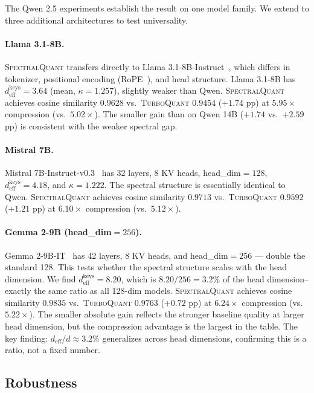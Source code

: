 \documentclass[11pt]{article}
\newcommand{\deff}{d_{\mathrm{eff}}}
\newcommand{\TQ}{\textsc{TurboQuant}}
\newcommand{\SQ}{\textsc{SpectralQuant}}
\begin{document}
The Qwen 2.5 experiments establish the result on one model family.  We extend
to three additional architectures to test universality.

\paragraph{Llama 3.1-8B.}
\SQ{} transfers directly to Llama 3.1-8B-Instruct~\citep{dubey2024llama3},
which differs in tokenizer, positional encoding (RoPE~\citep{su2024roformer}),
and head structure.  Llama 3.1-8B has $\deff^{\mathrm{keys}} = 3.64$ (mean,
$\kappa = 1.257$), slightly weaker than Qwen.  \SQ{} achieves cosine
similarity $0.9628$ vs.\ \TQ{} $0.9454$ ($+1.74$ pp) at $5.95\times$
compression (vs.\ $5.02\times$).  The smaller gain than on Qwen 14B ($+1.74$
vs.\ $+2.59$ pp) is consistent with the weaker spectral gap.

\paragraph{Mistral 7B.}
Mistral 7B-Instruct-v0.3~\citep{mistral7b} has 32 layers, 8 KV heads,
head\_dim$= 128$, $\deff^{\mathrm{keys}} = 4.18$, and $\kappa = 1.222$.  The
spectral structure is essentially identical to Qwen.  \SQ{} achieves cosine
similarity $0.9713$ vs.\ \TQ{} $0.9592$ ($+1.21$ pp) at $6.10\times$
compression (vs.\ $5.12\times$).

\paragraph{Gemma 2-9B (head\_dim$= 256$).}
Gemma 2-9B-IT~\citep{gemma2} has 42 layers, 8 KV heads, and head\_dim$= 256$
--- double the standard 128.  This tests whether the spectral structure scales
with the head dimension.  We find $\deff^{\mathrm{keys}} = 8.20$, which is
$8.20/256 = 3.2\%$ of the head dimension--exactly the same ratio as all
128-dim models.  \SQ{} achieves cosine similarity $0.9835$ vs.\ \TQ{} $0.9763$
($+0.72$ pp) at $6.24\times$ compression (vs.\ $5.22\times$).  The smaller
absolute gain reflects the stronger baseline quality at larger head dimension,
but the compression advantage is the largest in the table.  The key finding:
$\deff/d \approx 3.2\%$ generalizes across head dimensions, confirming this is
a ratio, not a fixed number.

\subsection{Robustness}
\label{sec:robustness}
\end{document}
